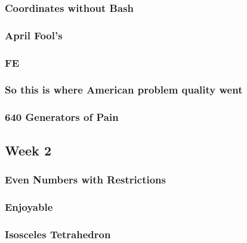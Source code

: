 \documentclass[titlepage=true]{scrartcl}
\begin{document}
    \subsubsection{Coordinates without Bash}
	\label{12-1-3}
	
	\newpage

    \subsubsection{April Fool's}
	\label{12-1-4}
	
	\newpage
	
	\subsubsection{FE}
	\label{12-1-5}
	
	\newpage

	\subsubsection{So this is where American problem quality went}
	\label{12-1-6}
	
	\newpage

	\subsubsection{640 Generators of Pain}
	\label{12-1-7}
	
	\newpage

    \subsection{Week 2}

    \subsubsection{Even Numbers with Restrictions}
	\label{12-2-1}
	
	\newpage
    
    \subsubsection{Enjoyable}
	\label{12-2-2}
	
	\newpage

    \subsubsection{Isosceles Tetrahedron}
	\label{12-2-3}
	
	\newpage
\end{document}
